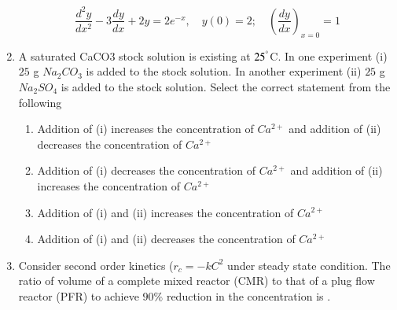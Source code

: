 \documentclass[journal]{IEEEtran}
\numberwithin{equation}{enumi}
\numberwithin{figure}{enumi}
\begin{document}
\begin{enumerate}[start=1, label={Q\arabic*.}]
\[\frac{d^{2}y}{dx^{2}} - 3\frac{dy}{dx} + 2y= 2e^{-x}, \quad y(0) =2; \quad \left(\frac{dy}{dx}\right )_{x=0} = 1\]
 \begin{enumerate} 
  \end{enumerate}
\item A saturated CaCO3 stock solution is existing at $25^\degree$C. In one experiment (i) $25$ g
$Na_2 CO_3$ is added to the stock solution. In another experiment (ii) $25$ g $Na_2 SO_4$ is added
to the stock solution. Select the correct statement from the following
\begin{enumerate}
  \item Addition of (i) increases the concentration of $Ca^{2+}$ and addition of (ii) decreases the
concentration of $Ca^{2+}$
  \item Addition of (i) decreases the concentration of $Ca^{2+}$ and addition of (ii) increases the
concentration of $Ca^{2+}$
  \item Addition of (i) and (ii) increases the concentration of $Ca^{2+}$
  \item Addition of (i) and (ii) decreases the concentration of $Ca^{2+}$
  \end{enumerate}
\item Consider second order kinetics ($r_c = -k C^2$ under steady state condition. The ratio of
volume of a complete mixed reactor (CMR) to that of a plug flow reactor (PFR) to achieve
$90\%$ reduction in the concentration is \underline{\hspace{1.5cm}}.


\end{enumerate}
\end{document}
